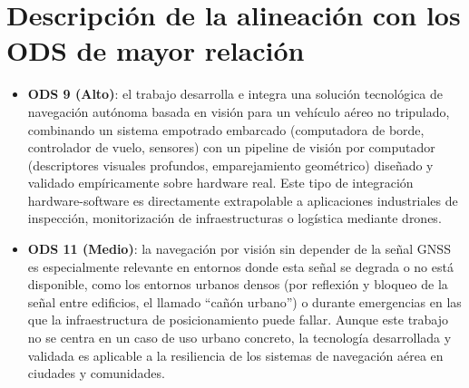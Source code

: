 \section*{Descripción de la alineación con los ODS de mayor relación}

\begin{itemize}
\item \textbf{ODS 9 (Alto)}: el trabajo desarrolla e integra una solución tecnológica de navegación autónoma basada en visión para un vehículo aéreo no tripulado, combinando un sistema empotrado embarcado (computadora de borde, controlador de vuelo, sensores) con un pipeline de visión por computador (descriptores visuales profundos, emparejamiento geométrico) diseñado y validado empíricamente sobre hardware real. Este tipo de integración hardware-software es directamente extrapolable a aplicaciones industriales de inspección, monitorización de infraestructuras o logística mediante drones.
\item \textbf{ODS 11 (Medio)}: la navegación por visión sin depender de la señal GNSS es especialmente relevante en entornos donde esta señal se degrada o no está disponible, como los entornos urbanos densos (por reflexión y bloqueo de la señal entre edificios, el llamado \enquote{cañón urbano}) o durante emergencias en las que la infraestructura de posicionamiento puede fallar. Aunque este trabajo no se centra en un caso de uso urbano concreto, la tecnología desarrollada y validada es aplicable a la resiliencia de los sistemas de navegación aérea en ciudades y comunidades.
\end{itemize}

